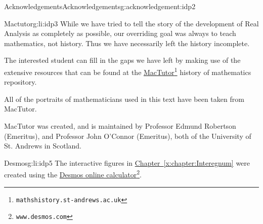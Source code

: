 \documentclass[oneside,10pt,]{book}
\newcommand{\xreffont}{\relax}
\numberwithin{equation}{section}
\begin{document}
\begin{acknowledgement}{Acknowledgements}{}{Acknowledgements}{}{}{g:acknowledgement:idp2}
%
\begin{descriptionlist}
\begin{dlimedium}{Mactutor}{g:li:idp3}%
While we have tried to tell the story of the development of Real Analysis as completely as possible, our overriding goal was always to teach mathematics, not history. Thus we have necessarily left the history incomplete.%
\par
The interested student can fill in the gaps we have left by making use of the extensive resources that can be found at the \href{https://mathshistory.st-andrews.ac.uk/}{MacTutor}\footnote{\nolinkurl{mathshistory.st-andrews.ac.uk}\label{g:fn:idp4}} history of mathematics repository.%
\par
All of the portraits of mathematicians used in this text have been taken from MacTutor.%
\par
MacTutor was created, and is maintained by Professor Edmund Robertson (Emeritus), and Professor John O'Connor (Emeritus), both of the University of St. Andrews in Scotland.%
\end{dlimedium}%
\begin{dlimedium}{Desmos}{g:li:idp5}%
The interactive figures in \hyperref[x:chapter:Interegnum]{Chapter~{\xreffont\ref{x:chapter:Interegnum}}} were created using the \href{https://www.desmos.com/}{Desmos online calculator}\footnote{\nolinkurl{www.desmos.com}\label{g:fn:idp6}}.%
\end{dlimedium}%
\end{descriptionlist}
%
\end{acknowledgement}
\setcounter{tocdepth}{0}
\renewcommand*\contentsname{Contents}
\tableofcontents
\mainmatter
%
%
\typeout{************************************************}
\typeout{************************************************}
%
\end{document}
